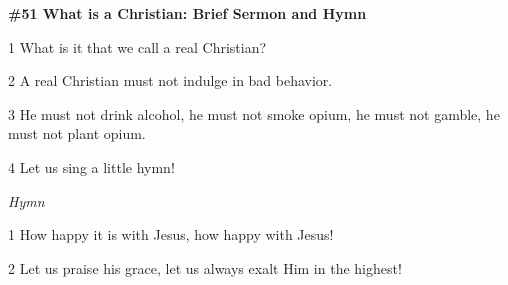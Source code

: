 
\textbf{\#51 What is a Christian: Brief Sermon and Hymn}

1 What is it that we call a real Christian?

2 A real Christian must not indulge in bad behavior.

3 He must not drink alcohol, he must not smoke opium, he must not gamble, he must
not plant opium.

4 Let us sing a little hymn!

\textit{Hymn}

1 How happy it is with Jesus, how happy with Jesus!

2 Let us praise his grace, let us always exalt Him in the highest!


